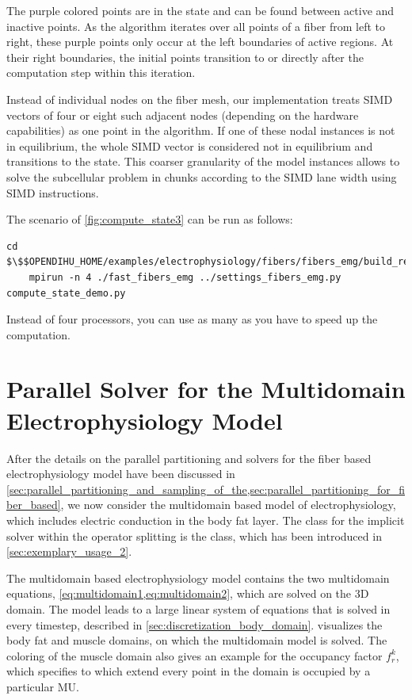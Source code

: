 The purple colored points are in the state  and can be found between active and inactive points. As the algorithm iterates over all points of a fiber from left to right, these purple points only occur at the left boundaries of active regions. At their right boundaries, the initial  points transition to  or  directly after the computation step within this iteration.

Instead of individual nodes on the fiber mesh, our implementation treats SIMD vectors of four or eight such adjacent nodes (depending on the hardware capabilities) as one point in the algorithm.  If one of these nodal instances is not in equilibrium, the whole SIMD vector is considered not in equilibrium and transitions to the  state. This coarser granularity of the model instances allows to solve the subcellular problem in chunks according to the SIMD lane width using SIMD instructions.

\begin{reproduce_no_break}
  The scenario of \cref{fig:compute_state3} can be run as follows:
  \begin{lstlisting}[columns=fullflexible,breaklines=true,postbreak=\mbox{\textcolor{gray}{$\hookrightarrow$}\space}]
    cd $\$$OPENDIHU_HOME/examples/electrophysiology/fibers/fibers_emg/build_release
    mpirun -n 4 ./fast_fibers_emg ../settings_fibers_emg.py compute_state_demo.py
  \end{lstlisting}
  Instead of four processors, you can use as many as you have to speed up the computation.
\end{reproduce_no_break}
\section{Parallel Solver for the Multidomain Electrophysiology Model}\label{sec:parallel_solver_multidomain}

After the details on the parallel partitioning and solvers for the fiber based electrophysiology model have been discussed in \cref{sec:parallel_partitioning_and_sampling_of_the,sec:parallel_partitioning_for_fiber_based}, we now consider the multidomain based model of electrophysiology, which includes electric conduction in the body fat layer. The class for the implicit solver within the operator splitting is the  class, which has been introduced in \cref{sec:exemplary_usage_2}.

The multidomain based electrophysiology model contains the two multidomain equations, \cref{eq:multidomain1,eq:multidomain2}, which are solved on the 3D domain. The model leads to a large linear system of equations that is solved in every timestep, described in \cref{sec:discretization_body_domain}. 
 visualizes the body fat and muscle domains, on which the multidomain model is solved. The coloring of the muscle domain also gives an example for the occupancy factor $f_r^k$, which specifies to which extend every point in the domain is occupied by a particular MU.

